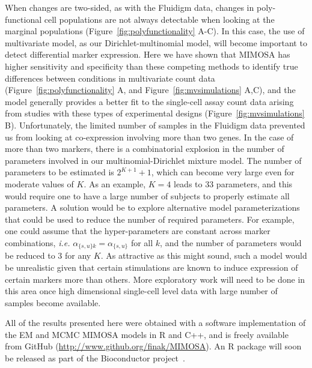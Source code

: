 \documentclass[useAMS,referee,usenatbib]{biom}
\begin{document}
When changes are two-sided, as with the Fluidigm data, changes in poly-functional cell populations are not always detectable when looking at the marginal populations (Figure~\ref{fig:polyfunctionality} A-C). 
In this case, the use of multivariate model, as our Dirichlet-multinomial model, will become important to detect differential marker expression. 
Here we have shown that MIMOSA has higher sensitivity and specificity than these competing methods to identify true differences between conditions in multivariate count data (Figure~\ref{fig:polyfunctionality} A, and Figure~\ref{fig:mvsimulations} A,C), and the model generally provides a better fit to the single-cell assay count data arising from studies with these types of experimental designs (Figure~\ref{fig:mvsimulations} B). 
Unfortunately, the limited number of samples in the Fluidigm data prevented us from looking at co-expression involving more than two genes. 
In the case of more than two markers, there is a combinatorial explosion in the number of parameters involved in our multinomial-Dirichlet mixture model. The number of parameters to be estimated is $2^{K+1}+1$, which can become very large even for moderate values of $K$. As an example, $K=4$ leads to 33 parameters, and this would require one to have a large number of subjects to properly estimate all parameters. 
A solution would be to explore alternative model parameterizations that could be used to reduce the number of required parameters. 
For example, one could assume that the hyper-parameters are constant across marker combinations, \textit{i.e.} $\alpha_{\{s,u\}k}=\alpha_{\{s,u\}}$ for all $k$, and the number of parameters would be reduced to $3$ for any $K$. 
As attractive as this might sound, such a model would be unrealistic given that certain stimulations are known to induce expression of certain markers more than others. 
More exploratory work will need to be done in this area once high dimensional single-cell level data with large number of samples become available.

All of the results presented here were obtained with a software implementation of the EM and MCMC MIMOSA models in R and C++, and is freely available from GitHub (\url{http://www.github.org/finak/MIMOSA}). An R package will soon be released as part of the Bioconductor project~\citep{Gentleman:2004tt}. 
\end{document}
